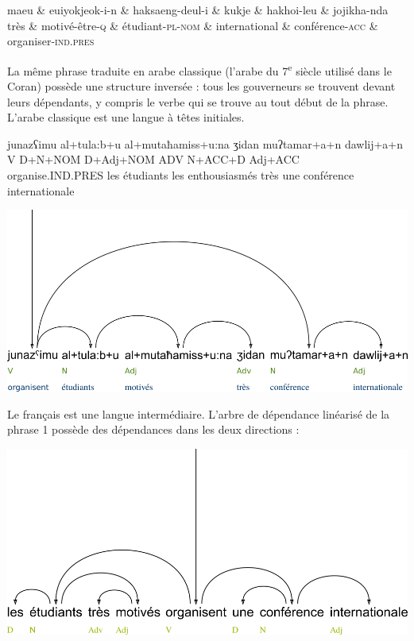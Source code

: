 {    \begin{dependency}[font=\footnotesize,arc edge, arc angle=80, text only label, label style={above}]
    \begin{deptext}
    maeu  \& {euiyokjeok-i-n} \& {haksaeng-deul-i} \& {kukje}       \& {hakhoi-leu}   \& {jojikha-nda}\\
    très  \& {motivé-être-\textsc{q}}  \& étudiant-\textsc{pl-nom}   \& international \& conférence-\textsc{acc} \& organiser-\textsc{ind.pres}\\
    \end{deptext}
    \end{dependency}
    \z

    La même phrase traduite en arabe classique (l’arabe du 7\textsuperscript{e} siècle utilisé dans le Coran) possède une structure inversée : tous les gouverneurs se trouvent devant leurs dépendants, y compris le verbe qui se trouve au tout début de la phrase. L’arabe classique est une langue à têtes initiales.
    
    \ea
    \glll junazʕimu  al+tula:b+u al+mutaħamiss+u:na ʒidan muʔtamar+a+n dawlij+a+n\\
    V  D+N+NOM D+Adj+NOM  ADV N+ACC+D  Adj+ACC\\
    organise.IND.PRES {les étudiants} {les enthousiasmés} très  une conférence internationale\\
    \z

    \includegraphics[width=\textwidth]{figures/vol1syntaxe2-img030.png}

    Le français est une langue intermédiaire. L’arbre de dépendance linéarisé de la phrase 1 possède des dépendances dans les deux directions :

    \includegraphics[width=\textwidth]{figures/vol1syntaxe2-img031.png}

}
